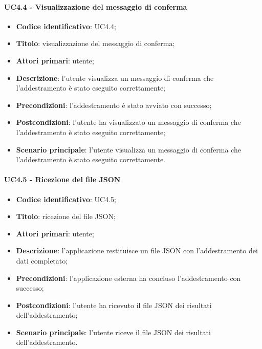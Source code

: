 \paragraph{UC4.4 - Visualizzazione del messaggio di conferma}
\begin{itemize}
	\item \textbf{Codice identificativo}: UC4.4;
	\item \textbf{Titolo}: visualizzazione del messaggio di conferma;
	\item \textbf{Attori primari}: utente;
	\item \textbf{Descrizione}: l'utente visualizza un messaggio di conferma che l'addestramento è stato eseguito correttamente;
	\item \textbf{Precondizioni}: l'addestramento è stato avviato con successo;
	\item \textbf{Postcondizioni}: l'utente ha visualizzato un messaggio di conferma che l'addestramento è stato eseguito correttamente;
	\item \textbf{Scenario principale}: l'utente visualizza un messaggio di conferma che l'addestramento è stato eseguito correttamente.
\end{itemize}


\paragraph{UC4.5 - Ricezione del file JSON}
\begin{itemize}
    \item \textbf{Codice identificativo}: UC4.5;
    \item \textbf{Titolo}: ricezione del file JSON;
    \item \textbf{Attori primari}: utente;
    \item \textbf{Descrizione}: l'applicazione restituisce un file JSON con l'addestramento dei dati completato;
    \item \textbf{Precondizioni}: l'applicazione esterna ha concluso l'addestramento con successo;
    \item \textbf{Postcondizioni}: l'utente ha ricevuto il file JSON dei risultati dell'addestramento;
    \item \textbf{Scenario principale}: l'utente riceve il file JSON dei risultati dell'addestramento.
\end{itemize}